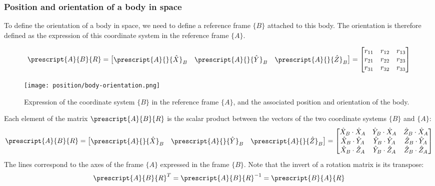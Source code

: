 \subsubsection{Position and orientation of a body in space}
To define the orientation of a body in space, we need to define a reference frame $\{B\}$ attached to this body. The orientation is therefore defined as the expression of this coordinate system in the reference frame $\{A\}$.
\begin{figure}[H]
    \centering

    \begin{minipage}{0.5\textwidth}
        \begin{equation*}
            \prescript{A}{B}{R} = \begin{bmatrix}
                \prescript{A}{}{\hat{X}}_B & \prescript{A}{}{\hat{Y}}_B & \prescript{A}{}{\hat{Z}}_B
            \end{bmatrix}
            = \begin{bmatrix}
                r_{11} & r_{12} & r_{13} \\
                r_{21} & r_{22} & r_{23} \\
                r_{31} & r_{32} & r_{33}
            \end{bmatrix}
        \end{equation*}
    \end{minipage}
    \begin{minipage}{0.4\textwidth}
        \centering
        \texttt{[image: position/body-orientation.png]}
    \end{minipage}
    \caption{Expression of the coordinate system $\{B\}$ in the reference frame $\{A\}$, and the associated position and orientation of the body.}
\end{figure}
Each element of the matrix $\prescript{A}{B}{R}$ is the scalar product between the vectors of the two coordinate systems $\{B\}$ and $\{A\}$:
\begin{equation*}
    \prescript{A}{B}{R} = \begin{bmatrix}
        \prescript{A}{}{\hat{X}}_B & \prescript{A}{}{\hat{Y}}_B & \prescript{A}{}{\hat{Z}}_B
    \end{bmatrix}
    = \begin{bmatrix}
        \hat{X}_B\cdot\hat{X}_A & \hat{Y}_B\cdot\hat{X}_A & \hat{Z}_B\cdot\hat{X}_A \\
        \hat{X}_B\cdot\hat{Y}_A & \hat{Y}_B\cdot\hat{Y}_A & \hat{Z}_B\cdot\hat{Y}_A \\
        \hat{X}_B\cdot\hat{Z}_A & \hat{Y}_B\cdot\hat{Z}_A & \hat{Z}_B\cdot\hat{Z}_A
    \end{bmatrix}
\end{equation*}
The lines correspond to the axes of the frame $\{A\}$ expressed in the frame $\{B\}$. Note that the invert of a rotation matrix is its transpose:
\begin{equation*}
    \prescript{A}{B}{R}^T = \prescript{A}{B}{R}^{-1} = \prescript{B}{A}{R}
\end{equation*}

